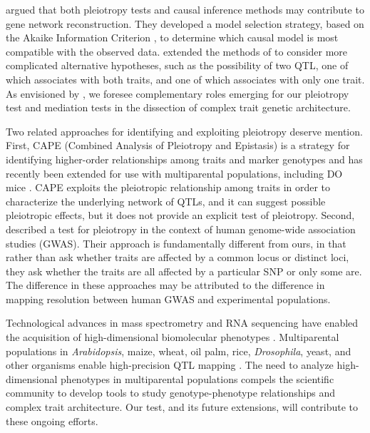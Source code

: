 \documentclass[oneside]{book}\usepackage[]{graphicx}\usepackage[]{color}
\begin{document}
\citet{schadt2005integrative} argued that
both pleiotropy tests and causal inference methods may contribute to gene network
reconstruction. They developed a model selection strategy, based on
the Akaike Information Criterion \citep{akaike1974new}, to determine which
causal model is most compatible with the observed data.
\citet{schadt2005integrative} extended the methods of
\citet{jiang1995multiple} to consider more complicated alternative
hypotheses, such as the possibility of two QTL, one of which
associates with both traits, and one of which associates with only one
trait. As envisioned by \citet{schadt2005integrative}, we foresee
complementary roles emerging for our pleiotropy test
and mediation tests in the dissection of complex trait genetic
architecture.

Two related approaches for identifying and exploiting pleiotropy
deserve mention. First, CAPE (Combined Analysis of Pleiotropy and
Epistasis) is a strategy for identifying higher-order
relationships among traits and marker genotypes
\citep{tyler2013cape,tyler2016weak} and has recently been extended for
use with multiparental populations, including DO mice
\citep{tyler2017epistatic}. CAPE exploits the pleiotropic relationship
among traits in order to characterize the underlying network of QTLs,
and it can suggest possible pleiotropic effects, but it does not
provide an explicit test of pleiotropy.
Second, \citet{schaid2016statistical} described a test for pleiotropy in the
context of human genome-wide association studies (GWAS). Their approach is
fundamentally different from ours, in that rather than ask whether
traits are affected by a common locus or distinct loci, they ask
whether the traits are all affected by a particular SNP or only some
are. The difference in these approaches may be attributed to the difference in
mapping resolution between human GWAS and experimental populations.

Technological advances
in mass spectrometry and RNA sequencing have enabled the acquisition of
high-dimensional biomolecular phenotypes
\citep{ozsolak2011rna,han2012multi}. Multiparental populations in
\textit{Arabidopsis}, maize, wheat, oil palm, rice,
\textit{Drosophila}, yeast, and other organisms enable high-precision
QTL mapping \citep{yu2008genetic, tisne2017identification,
  stanley2017genetic, raghavan2017approaches, mackay2012drosophila,
  kover2009multiparent, cubillos2013high}. The need to analyze
high-dimensional phenotypes in multiparental populations compels the
scientific community to develop tools to study genotype-phenotype
relationships and complex trait architecture. Our test, and its future
extensions, will contribute to these ongoing efforts.
\end{document}
